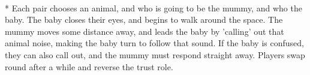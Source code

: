 \begin{minipage}{\textwidth}
\\*
Each pair chooses an animal, and who is going to be the mummy, and who the baby.  The baby closes their eyes, and begins to walk around the space.  The mummy moves some distance away, and leads the baby by 'calling' out that animal noise, making the baby turn to follow that sound.  If the baby is confused, they can also call out, and the mummy must respond straight away.  Players swap round after a while and reverse the trust role.
\end{minipage}    \vfill
